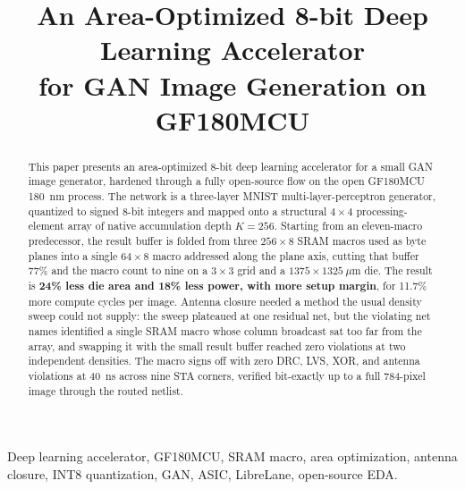 \documentclass[conference,a4paper]{APSIPA2026}
\begin{document}
\title{An Area-Optimized 8-bit Deep Learning Accelerator\\for GAN Image Generation on GF180MCU}

\author{
}

\maketitle
\thispagestyle{firststyle}
\pagestyle{empty}

\begin{abstract}
This paper presents an area-optimized 8-bit deep learning accelerator for a small GAN image generator, hardened through a fully open-source flow on the open GF180MCU 180~nm process. The network is a three-layer MNIST multi-layer-perceptron generator, quantized to signed 8-bit integers and mapped onto a structural $4\times4$ processing-element array of native accumulation depth $K=256$. Starting from an eleven-macro predecessor, the result buffer is folded from three $256\times8$ SRAM macros used as byte planes into a single $64\times8$ macro addressed along the plane axis, cutting that buffer 77\% and the macro count to nine on a $3\times3$ grid and a $1375\times1325~\mu$m die. The result is \textbf{24\% less die area and 18\% less power, with more setup margin}, for 11.7\% more compute cycles per image. Antenna closure needed a method the usual density sweep could not supply: the sweep plateaued at one residual net, but the violating net names identified a single SRAM macro whose column broadcast sat too far from the array, and swapping it with the small result buffer reached zero violations at two independent densities. The macro signs off with zero DRC, LVS, XOR, and antenna violations at 40~ns across nine STA corners, verified bit-exactly up to a full 784-pixel image through the routed netlist.
\end{abstract}

\begin{IEEEkeywords}
Deep learning accelerator, GF180MCU, SRAM macro, area optimization, antenna closure, INT8 quantization, GAN, ASIC, LibreLane, open-source EDA.
\end{IEEEkeywords}
\end{document}
